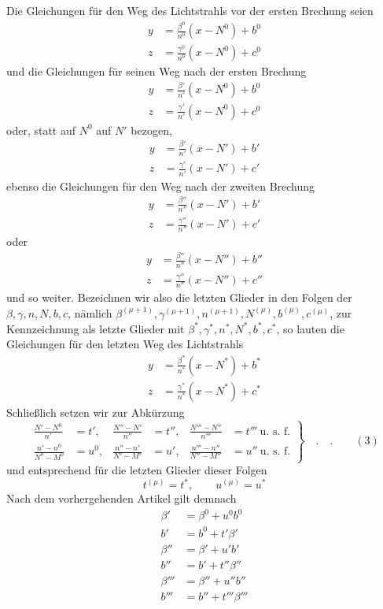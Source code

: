 Die Gleichungen für den Weg des Lichtstrahls vor der ersten Brechung seien
\[
\begin{aligned}
y&=\frac{\beta^0}{n^0}(x-N^0)+b^0\\
z&=\frac{\gamma^0}{n^0}(x-N^0)+c^0
\end{aligned}
\]
und die Gleichungen für seinen Weg nach der ersten Brechung
\[
\begin{aligned}
y&=\frac{\beta'}{n'}(x-N^0)+b^0\\
z&=\frac{\gamma'}{n'}(x-N^0)+c^0
\end{aligned}
\]
oder, statt auf $N^0$ auf $N'$ bezogen,
\[
\begin{aligned}
y&=\frac{\beta'}{n'}(x-N')+b'\\
z&=\frac{\gamma'}{n'}(x-N')+c'
\end{aligned}
\]
ebenso die Gleichungen für den Weg nach der zweiten Brechung
\[
\begin{aligned}
y&=\frac{\beta''}{n''}(x-N')+b'\\
z&=\frac{\gamma''}{n''}(x-N')+c'
\end{aligned}
\]
oder
\[
\begin{aligned}
y&=\frac{\beta''}{n''}(x-N'')+b''\\
z&=\frac{\gamma''}{n''}(x-N'')+c''
\end{aligned}
\]
und so weiter. Bezeichnen wir also die letzten Glieder in den Folgen der $\beta,\gamma,n,N,b,c$, nämlich $\beta^{(\mu+1)},\gamma^{(\mu+1)},n^{(\mu+1)},N^{(\mu)},b^{(\mu)},c^{(\mu)}$, zur Kennzeichnung als letzte Glieder mit $\beta^*,\gamma^*,n^*,N^*,b^*,c^*$, so lauten die Gleichungen für den letzten Weg des Lichtstrahls
\[
\begin{aligned}
y&=\frac{\beta^*}{n^*}(x-N^*)+b^*\\
z&=\frac{\gamma^*}{n^*}(x-N^*)+c^*
\end{aligned}
\]
Schließlich setzen wir zur Abkürzung
\[
\left.\begin{aligned}
\frac{N'-N^0}{n'}&=t',&\frac{N''-N'}{n''}&=t'',&\frac{N'''-N''}{n'''}&=t'''\ \text{u. s. f.}\\
\frac{n'-n^0}{N^0-M^0}&=u^0,&\frac{n''-n'}{N'-M'}&=u',&\frac{n'''-n''}{N''-M''}&=u''\ \text{u. s. f.}
\end{aligned}\right\}\quad .\quad .\qquad (3)
\]
und entsprechend für die letzten Glieder dieser Folgen
\[
t^{(\mu)}=t^*,\qquad u^{(\mu)}=u^*
\]
Nach dem vorhergehenden Artikel gilt demnach
\[
\begin{aligned}
\beta'&=\beta^0+u^0b^0\\
b'&=b^0+t'\beta'\\
\beta''&=\beta'+u'b'\\
b''&=b'+t''\beta''\\
\beta'''&=\beta''+u''b''\\
b'''&=b''+t'''\beta'''
\end{aligned}
\]

